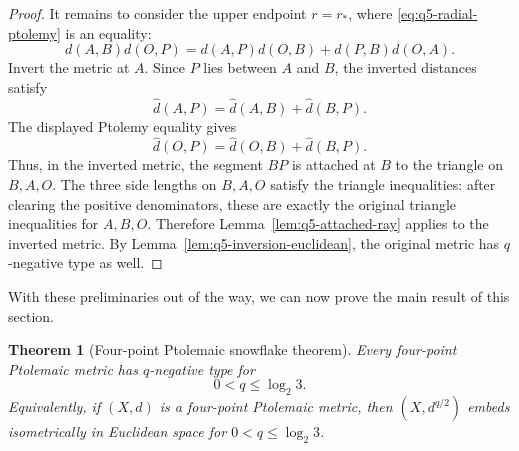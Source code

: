 \documentclass[12pt]{amsart}
\newtheorem{theorem}{Theorem}[section]
\theoremstyle{definition}
\newcommand{\1}{\mathbf{1}}
\begin{document}
\begin{proof}
It remains to consider the upper endpoint $r=r_*$, where
\eqref{eq:q5-radial-ptolemy} is an equality:
\[
        d(A,B)d(O,P)=d(A,P)d(O,B)+d(P,B)d(O,A).
\]
Invert the metric at $A$.  Since $P$ lies between $A$ and $B$, the inverted
distances satisfy
\[
        \widehat d(A,P)=\widehat d(A,B)+\widehat d(B,P).
\]
The displayed Ptolemy equality gives
\[
        \widehat d(O,P)=\widehat d(O,B)+\widehat d(B,P).
\]
Thus, in the inverted metric, the segment $BP$ is attached at $B$ to the triangle
on $B,A,O$.  The three side lengths on $B,A,O$ satisfy the triangle inequalities:
after clearing the positive denominators, these are exactly the original triangle
inequalities for $A,B,O$.  Therefore Lemma~\ref{lem:q5-attached-ray} applies to the
inverted metric.  By Lemma~\ref{lem:q5-inversion-euclidean}, the original metric has
$q$-negative type as well.
\end{proof}

With these preliminaries out of the way, we can now prove the main result of this section.

\begin{theorem}[Four-point Ptolemaic snowflake theorem]
\label{thm:q5-four-point-ptolemaic}
Every four-point Ptolemaic metric has $q$-negative type for
\[
        0<q\le \log_2 3.
\]
Equivalently, if $(X,d)$ is a four-point Ptolemaic metric, then
$(X,d^{q/2})$ embeds isometrically in Euclidean space for
$0<q\le\log_2 3$.
\end{theorem}
\end{document}
